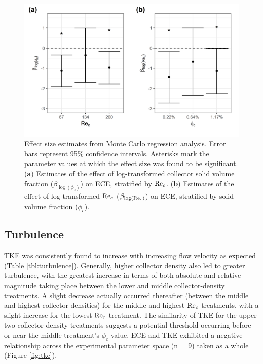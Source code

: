 \documentclass[geosciences,article,submit,moreauthors,pdftex]{Definitions/mdpi}
\begin{document}
\begin{figure}[H]
\centering
\includegraphics[width=5in]{../pics/montecarlo.png}
\caption{Effect size estimates from Monte Carlo regression analysis. Error bars represent 95\% confidence intervals. Asterisks mark the parameter values at which the effect size was found to be significant. (\textbf{a}) Estimates of the effect of log-transformed collector solid volume fraction ($\beta_{\log(\phi_c)}$) on ECE, stratified by $\mathrm{Re}_c$. (\textbf{b}) Estimates of the effect of log-transformed $\mathrm{Re}_c$ ($\beta_{\log(\mathrm{Re}_c)}$) on ECE, stratified by solid volume fraction ($\phi_c$).}
\label{fig:monte}
\end{figure}   

\subsection{Turbulence}

TKE was consistently found to increase with increasing flow velocity as expected (Table \ref{tbl:turbulence}). Generally, higher collector density also led to greater turbulence, with the greatest increase in terms of both absolute and relative magnitude taking place between the lower and middle collector-density treatments. A slight decrease actually occurred thereafter (between the middle and highest collector densities) for the middle and highest $\mathrm{Re}_c$ treatments, with a slight increase for the lowest $\mathrm{Re}_c$ treatment. The similarity of TKE for the upper two collector-density treatments suggests a potential threshold occurring before or near the middle treatment's $\phi_c$ value. ECE and TKE exhibited a negative relationship across the experimental parameter space (n = 9) taken as a whole (Figure \ref{fig:tke}).
\end{document}
